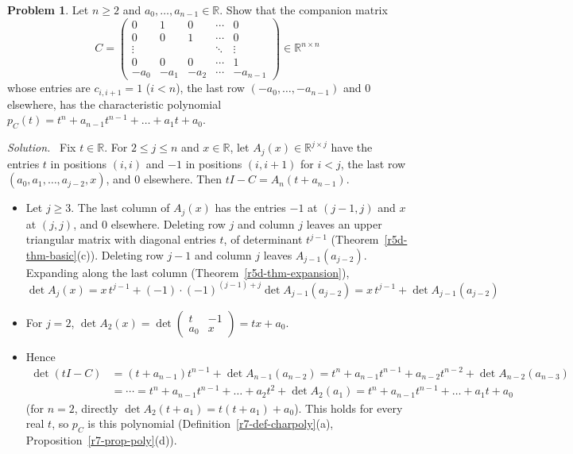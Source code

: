 \documentclass[12pt]{article}
\newcommand{\R}{\mathbb R}
\theoremstyle{definition}
\newtheorem{problem}{Problem}
\newenvironment{solution}{\par\noindent\textit{Solution.}\ }{\par\smallskip}
\begin{document}
\begin{problem}\label{r7-ex-companion}
Let \(n\geqslant2\) and \(a_0,\dots,a_{n-1}\in\R\). Show that the companion matrix
\[
C=\begin{pmatrix}0&1&0&\cdots&0\\0&0&1&\cdots&0\\\vdots&&&\ddots&\vdots\\0&0&0&\cdots&1\\-a_0&-a_1&-a_2&\cdots&-a_{n-1}\end{pmatrix}
\in\R^{n\times n}
\]
whose entries are \(c_{i,i+1}=1\) (\(i<n\)), the last row \((-a_0,\dots,-a_{n-1})\) and \(0\) elsewhere, has the
characteristic polynomial \(p_C(t)=t^n+a_{n-1}t^{n-1}+\dots+a_1t+a_0\).
\end{problem}
\begin{solution}
Fix \(t\in\R\). For \(2\leqslant j\leqslant n\) and \(x\in\R\), let \(A_j(x)\in\R^{j\times j}\) have the entries \(t\) in
positions \((i,i)\) and \(-1\) in positions \((i,i+1)\) for \(i<j\), the last row \((a_0,a_1,\dots,a_{j-2},x)\), and \(0\)
elsewhere. Then \(tI-C=A_n(t+a_{n-1})\).
\begin{itemize}
\item Let \(j\geqslant3\). The last column of \(A_j(x)\) has the entries \(-1\) at \((j-1,j)\) and \(x\) at \((j,j)\), and \(0\)
elsewhere.
Deleting row \(j\) and column \(j\) leaves an upper triangular matrix with diagonal entries \(t\), of determinant
\(t^{j-1}\) (Theorem~\ref{r5d-thm-basic}(c)). Deleting row \(j-1\) and column \(j\) leaves \(A_{j-1}(a_{j-2})\). Expanding
along the last column (Theorem~\ref{r5d-thm-expansion}),
\[
\det A_j(x)=x\,t^{j-1}+(-1)\cdot(-1)^{(j-1)+j}\det A_{j-1}(a_{j-2})=x\,t^{j-1}+\det A_{j-1}(a_{j-2})
\]
\item For \(j=2\), \(\det A_2(x)=\det\left(\begin{smallmatrix}t&-1\\a_0&x\end{smallmatrix}\right)=tx+a_0\).
\item Hence
\[
\begin{aligned}
\det(tI-C)&=(t+a_{n-1})t^{n-1}+\det A_{n-1}(a_{n-2})=t^n+a_{n-1}t^{n-1}+a_{n-2}t^{n-2}+\det A_{n-2}(a_{n-3})\\
&=\cdots=t^n+a_{n-1}t^{n-1}+\dots+a_2t^2+\det A_2(a_1)=t^n+a_{n-1}t^{n-1}+\dots+a_1t+a_0
\end{aligned}
\]
(for \(n=2\), directly \(\det A_2(t+a_1)=t(t+a_1)+a_0\)). This holds for every real \(t\), so \(p_C\) is this polynomial
(Definition~\ref{r7-def-charpoly}(a), Proposition~\ref{r7-prop-poly}(d)).
\end{itemize}
\end{solution}
\end{document}
